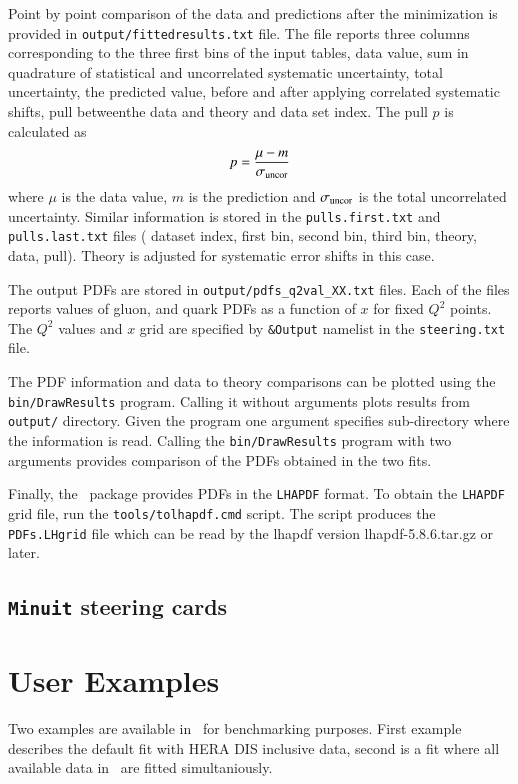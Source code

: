   Point by point comparison of the data and predictions after the minimization 
  is provided in {\tt output/fittedresults.txt} file. The file reports three columns
  corresponding to the three first bins of the input tables, data value, sum in 
  quadrature of statistical and uncorrelated systematic uncertainty, total
  uncertainty, the predicted value, before and after applying correlated systematic shifts,
  pull betweenthe  data and theory and 
  data set index. The pull $p$ is calculated as 
  \begin{equation}
      p = \frac{ \mu - m} {\sigma_{\rm uncor}}
  \end{equation}
  where $\mu$ is the data value, $m$ is the prediction and $\sigma_{\rm uncor}$ is the total
  uncorrelated uncertainty.
  Similar information is stored in the {\tt pulls.first.txt} and {\tt pulls.last.txt} files
  ( dataset index, first bin, second bin, third bin, theory, data, pull).
  Theory is  adjusted for systematic error shifts in this case.

  The output PDFs are stored in  {\tt output/pdfs\_q2val\_XX.txt} files.
  Each of the files reports values of gluon, and quark PDFs as a function of $x$
  for fixed $Q^2$ points. The $Q^2$ values and $x$ grid are specified by 
  {\tt \&Output} namelist in the {\tt steering.txt} file.
  
  The PDF information and data to theory comparisons can be plotted using 
  the {\tt bin/DrawResults} program.  Calling it without arguments plots results from
  {\tt output/} directory. Given the program one argument specifies sub-directory 
  where the information is read. Calling the {\tt bin/DrawResults} program with two
  arguments provides comparison of the PDFs obtained in the two fits.
  
  Finally, the \fitter\ package provides PDFs in the {\tt LHAPDF} format. To obtain the
  {\tt LHAPDF} grid file, run the {\tt tools/tolhapdf.cmd} script. The script produces 
  the {\tt PDFs.LHgrid} file which can be read by the lhapdf version lhapdf-5.8.6.tar.gz
  or later.
\subsection{{\tt Minuit} steering cards}

\section{User Examples}
Two examples are available in \fitter\ for benchmarking purposes.
First example describes the default fit with HERA DIS inclusive data,
second is a fit where all available data in \fitter\ are fitted simultaniously.

